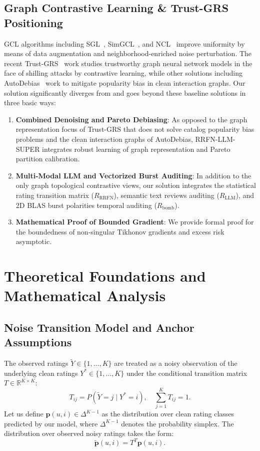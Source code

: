 \documentclass[10pt,journal]{IEEEtran}
\begin{document}
\subsection{Graph Contrastive Learning \& Trust-GRS Positioning}
GCL algorithms including SGL~\cite{wu2021sgl}, SimGCL~\cite{yu2022simgcl}, and NCL~\cite{lin2022ncl} improve uniformity by means of data augmentation and neighborhood-enriched noise perturbation. The recent Trust-GRS~\cite{trustgrs2025} work studies trustworthy graph neural network models in the face of shilling attacks by contrastive learning, while other solutions including AutoDebias~\cite{chen2021autodebias} work to mitigate popularity bias in clean interaction graphs. Our solution significantly diverges from and goes beyond these baseline solutions in three basic ways:
\begin{enumerate}
    \item \textbf{Combined Denoising and Pareto Debiasing}: As opposed to the graph representation focus of Trust-GRS that does not solve catalog popularity bias problems and the clean interaction graphs of AutoDebias, RRFN-LLM-SUPER integrates robust learning of graph representation and Pareto partition calibration.
    \item \textbf{Multi-Modal LLM and Vectorized Burst Auditing}: In addition to the only graph topological contrastive views, our solution integrates the statistical rating transition matrix ($R_{\text{RRFN}}$), semantic text reviews auditing ($R_{\text{LLM}}$), and 2D BLAS burst polarities temporal auditing ($R_{\text{bomb}}$).
    \item \textbf{Mathematical Proof of Bounded Gradient}: We provide formal proof for the boundedness of non-singular Tikhonov gradients and excess risk asymptotic.
\end{enumerate}

\section{Theoretical Foundations and Mathematical Analysis}
\label{sec:theory}

\subsection{Noise Transition Model and Anchor Assumptions}
The observed ratings $\tilde{Y} \in \{1, \dots, K\}$ are treated as a noisy observation of the underlying clean ratings $Y^* \in \{1, \dots, K\}$ under the conditional transition matrix $T \in \mathbb{R}^{K \times K}$:
\begin{equation}
    T_{ij} = P(\tilde{Y} = j \mid Y^* = i), \quad \sum_{j=1}^K T_{ij} = 1.
\end{equation}
Let us define $\mathbf{p}(u, i) \in \Delta^{K-1}$ as the distribution over clean rating classes predicted by our model, where $\Delta^{K-1}$ denotes the probability simplex. The distribution over observed noisy ratings takes the form:
\begin{equation}
    \tilde{\mathbf{p}}(u, i) = T^T \mathbf{p}(u, i).
\end{equation}
\end{document}
